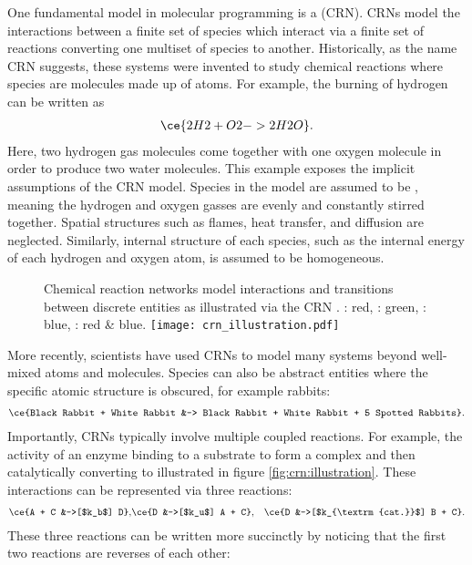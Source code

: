 One fundamental model in molecular programming is a  (CRN). CRNs model the interactions between a finite set of species which interact via a finite set of reactions converting one multiset of species to another. Historically, as the name CRN suggests, these systems were invented to study chemical reactions where species are molecules made up of atoms. For example, the burning of hydrogen can be written as
%
\begin{align*}
    \ce{2H2 + O2 -> 2H2O}.
\end{align*}
%
Here, two hydrogen gas molecules come together with one oxygen molecule in order to produce two water molecules. This example exposes the implicit assumptions of the CRN model. Species in the model are assumed to be , meaning the hydrogen and oxygen gasses are evenly and constantly stirred together. Spatial structures such as flames, heat transfer, and diffusion are neglected. Similarly, internal structure of each species, such as the internal energy of each hydrogen and oxygen atom, is assumed to be homogeneous.
%
\begin{figure}[label=fig:crn:illustration,credit={Anastasia Ershova}]{%
    Chemical reaction networks model interactions and transitions between discrete entities as illustrated via the CRN . : red, : green, : blue, : red \& blue.}
    \texttt{[image: crn\_illustration.pdf]}
\end{figure}
%
More recently, scientists have used CRNs to model many systems beyond well-mixed atoms and molecules. Species can also be abstract entities where the specific atomic structure is obscured, for example rabbits:
%
\begin{align*}
    \ce{Black Rabbit + White Rabbit &-> Black Rabbit + White Rabbit + 5 Spotted Rabbits}.
\end{align*}
%
Importantly, CRNs typically involve multiple coupled reactions. For example, the activity of an enzyme  binding to a substrate  to form a complex  and then catalytically converting  to  illustrated in figure \ref{fig:crn:illustration}. These interactions can be represented via three reactions:
%
\begin{align*}
    \label{eq:crn:mm-catalysis}
    \ce{A + C &->[$k_b$] D}, &
    \ce{D &->[$k_u$] A + C}, &
    \ce{D &->[$k_{\textrm{cat.}}$] B + C}.
\end{align*}
%
These three reactions can be written more succinctly by noticing that the first two reactions are reverses of each other:
